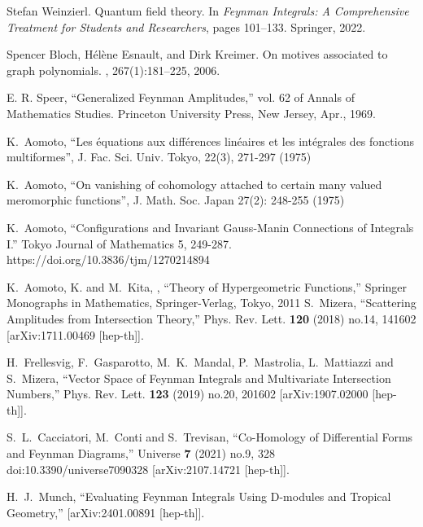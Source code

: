 \documentclass[a4paper,12pt]{article}
\numberwithin{equation}{section}
\numberwithin{figure}{section}
\begin{document}
\begin{thebibliography}{99}
Stefan Weinzierl.
\newblock Quantum field theory.
\newblock In {\em Feynman Integrals: A Comprehensive Treatment for Students and
  Researchers}, pages 101--133. Springer, 2022.
\newblock [arXiv:2201.03593] 
  
Spencer Bloch, H{\'e}l{\`e}ne Esnault, and Dirk Kreimer.
\newblock On motives associated to graph polynomials.
,
267(1):181--225, 2006.

  E. R. Speer, ``Generalized Feynman Amplitudes,'' vol. 62 of Annals of Mathematics Studies. Princeton University Press, New Jersey, Apr., 1969.
  


    K.~Aomoto, ``Les \'equations aux diff\'erences
     lin\'eaires et les int\'egrales des fonctions multiformes'',
     J. Fac. Sci. Univ. Tokyo, 22(3), 271-297  (1975)

   K.~Aomoto, ``On vanishing of cohomology attached to
    certain many valued meromorphic functions'', J. Math. Soc. Japan
    27(2): 248-255 (1975)

  
  K.~Aomoto, ``Configurations and Invariant Gauss-Manin Connections of Integrals I.'' Tokyo Journal of Mathematics 5, 249-287. https://doi.org/10.3836/tjm/1270214894

     K.~Aomoto, K. and M.~Kita, , ``Theory of Hypergeometric Functions,'' Springer Monographs in Mathematics, Springer-Verlag, Tokyo, 2011
S.~Mizera,
``Scattering Amplitudes from Intersection Theory,''
Phys. Rev. Lett. \textbf{120} (2018) no.14, 141602
[arXiv:1711.00469 [hep-th]].

H.~Frellesvig, F.~Gasparotto, M.~K.~Mandal, P.~Mastrolia, L.~Mattiazzi and S.~Mizera,
``Vector Space of Feynman Integrals and Multivariate Intersection Numbers,''
Phys. Rev. Lett. \textbf{123} (2019) no.20, 201602
[arXiv:1907.02000 [hep-th]].
    
S.~L.~Cacciatori, M.~Conti and S.~Trevisan,
``Co-Homology of Differential Forms and Feynman Diagrams,''
Universe \textbf{7} (2021) no.9, 328
doi:10.3390/universe7090328
[arXiv:2107.14721 [hep-th]].

H.~J.~Munch,
``Evaluating Feynman Integrals Using D-modules and Tropical Geometry,''
[arXiv:2401.00891 [hep-th]].
  

\end{thebibliography}
\end{document}
